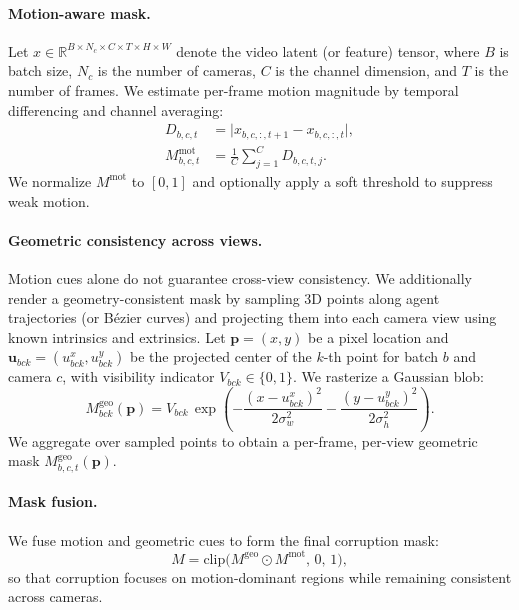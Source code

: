 \documentclass{article}
\begin{document}
\paragraph{Motion-aware mask.}
Let $x \in \mathbb{R}^{B\times N_c \times C \times T \times H \times W}$ denote the video latent (or feature) tensor, where $B$ is batch size, $N_c$ is the number of cameras, $C$ is the channel dimension, and $T$ is the number of frames. We estimate per-frame motion magnitude by temporal differencing and channel averaging:
\begin{equation}
\label{eq:motion_map}
\begin{aligned}
D_{b,c,t} &= \big| x_{b,c,:,t+1} - x_{b,c,:,t} \big|, \\
M^{\mathrm{mot}}_{b,c,t} &= \frac{1}{C}\sum_{j=1}^{C} D_{b,c,t,j}.
\end{aligned}
\end{equation}
We normalize $M^{\mathrm{mot}}$ to $[0,1]$ and optionally apply a soft threshold to suppress weak motion.

\paragraph{Geometric consistency across views.}
Motion cues alone do not guarantee cross-view consistency. We additionally render a geometry-consistent mask by sampling 3D points along agent trajectories (or B\'ezier curves) and projecting them into each camera view using known intrinsics and extrinsics. Let $\mathbf{p}=(x,y)$ be a pixel location and $\mathbf{u}_{bck}=(u^x_{bck},u^y_{bck})$ be the projected center of the $k$-th point for batch $b$ and camera $c$, with visibility indicator $V_{bck}\in\{0,1\}$. We rasterize a Gaussian blob:
\begin{equation}
\label{eq:geo_mask_compact}
M^{\mathrm{geo}}_{bck}(\mathbf{p})
= V_{bck}\,
\exp\!\left(
-\frac{(x-u^{x}_{bck})^{2}}{2\sigma_w^{2}}
-\frac{(y-u^{y}_{bck})^{2}}{2\sigma_h^{2}}
\right).
\end{equation}
We aggregate over sampled points to obtain a per-frame, per-view geometric mask $M^{\mathrm{geo}}_{b,c,t}(\mathbf{p})$.

\paragraph{Mask fusion.}
We fuse motion and geometric cues to form the final corruption mask:
\begin{equation}
\label{eq:mask_fusion}
M = \mathrm{clip}\!\big(M^{\mathrm{geo}} \odot M^{\mathrm{mot}},\,0,\,1\big),
\end{equation}
so that corruption focuses on motion-dominant regions while remaining consistent across cameras.
\end{document}
